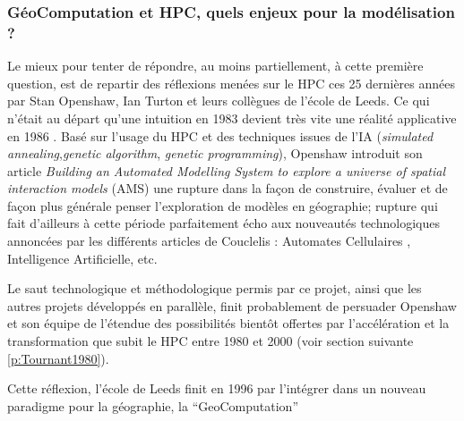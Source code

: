 \subsubsection{GéoComputation et HPC, quels enjeux pour la modélisation ? }
\label{sssec:enjeuxHPC}

Le mieux pour tenter de répondre, au moins partiellement, à cette première question, est de repartir des réflexions menées sur le HPC ces 25 dernières années par Stan Openshaw, Ian Turton et leurs collègues de l'école de Leeds. Ce qui n'était au départ qu'une intuition en 1983 devient très vite une réalité applicative en 1986 \autocite{Openshaw1988}. Basé sur l'usage du HPC et des techniques issues de l'IA (\textit{simulated annealing},\textit{genetic algorithm}, \textit{genetic programming}), Openshaw introduit son article \textit{Building an Automated Modelling System to explore a universe of spatial interaction models} (AMS) une rupture dans la façon de construire, évaluer et de façon plus générale penser l'exploration de modèles en géographie; rupture qui fait d'ailleurs à cette période parfaitement écho aux nouveautés technologiques annoncées par les différents articles de Couclelis : Automates Cellulaires \autocite{Couclelis1985}, Intelligence Artificielle, etc. \autocite{Couclelis1986}

Le saut technologique et méthodologique permis par ce projet, ainsi que les autres projets développés en parallèle, finit probablement de persuader Openshaw et son équipe de l'étendue des possibilités bientôt offertes par l'accélération et la transformation que subit le HPC entre 1980 et 2000 (voir section suivante \ref{p:Tournant1980}).

Cette réflexion, l'école de Leeds finit en 1996 par l'intégrer dans un nouveau paradigme pour la géographie, la \foreignquote{english}{GeoComputation}

